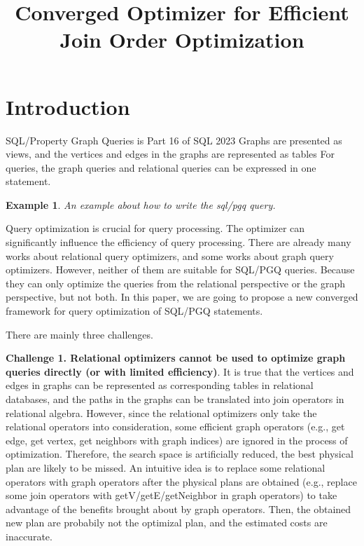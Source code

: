 \documentclass[sigconf, nonacm]{acmart}
\newtheorem{example}{Example}
\begin{document}
\title{Converged Optimizer for Efficient Join Order Optimization}



\begin{abstract}

\end{abstract}

\maketitle

\section{Introduction}

SQL/Property Graph Queries is Part 16 of SQL 2023
Graphs are presented as views, and the vertices and edges in the graphs are represented as tables
For queries, the graph queries and relational queries can be expressed in one statement.

\begin{example}
An example about how to write the sql/pgq query.
\end{example}

Query optimization is crucial for query processing.
The optimizer can significantly influence the efficiency of query processing.
There are already many works about relational query optimizers, and some works about graph query optimizers.
However, neither of them are suitable for SQL/PGQ queries.
Because they can only optimize the queries from the relational perspective or the graph perspective, but not both.
In this paper, we are going to propose a new converged framework for query optimization of SQL/PGQ statements.

There are mainly three challenges.

\textbf{Challenge 1. Relational optimizers cannot be used to optimize graph queries directly (or with limited efficiency)}.
It is true that the vertices and edges in graphs can be represented as corresponding tables in relational databases, and the paths in the graphs can be translated into join operators in relational algebra.
However, since the relational optimizers only take the relational operators into consideration, some efficient graph operators (e.g., get edge, get vertex, get neighbors with graph indices) are ignored in the process of optimization.
Therefore, the search space is artificially reduced, the best physical plan are likely to be missed.
An intuitive idea is to replace some relational operators with graph operators after the physical plans are obtained (e.g., replace some join operators with getV/getE/getNeighbor in graph operators) to take advantage of the benefits brought about by graph operators.
Then, the obtained new plan are probabily not the optimizal plan, and the estimated costs are inaccurate.
\end{document}
